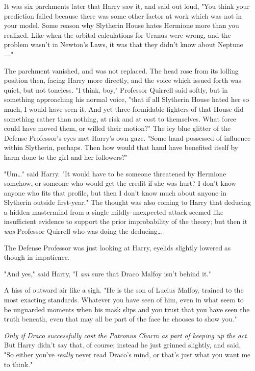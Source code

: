 It was six parchments later that Harry saw it, and said out loud, "You think
your prediction failed because there was some other factor at work which was
not in your model. Some reason why Slytherin House hates Hermione more than you
realized. Like when the orbital calculations for Uranus were wrong, and the
problem wasn't in Newton's Laws, it was that they didn't know about Neptune---"

The parchment vanished, and was not replaced. The head rose from its lolling
position then, facing Harry more directly, and the voice which issued forth was
quiet, but not toneless. "I think, boy," Professor Quirrell said softly, but in
something approaching his normal voice, "that if all Slytherin House hated her
so much, I would have seen it. And yet three formidable fighters of that House
did something rather than nothing, at risk and at cost to themselves. What
force could have moved them, or willed their motion?" The icy blue glitter of
the Defense Professor's eyes met Harry's own gaze. "Some hand possessed of
influence within Slytherin, perhaps. Then how would that hand have benefited
itself by harm done to the girl and her followers?"

"Um{\ldots}" said Harry. "It would have to be someone threatened by Hermione
somehow, or someone who would get the credit if she was hurt? I don't know
anyone who fits that profile, but then I don't know much about anyone in
Slytherin outside first-year." The thought was also coming to Harry that
deducing a hidden mastermind from a single mildly-unexpected attack seemed like
insufficient evidence to support the prior improbability of the theory; but
then it \emph{was} Professor Quirrell who was doing the deducing{\ldots}

The Defense Professor was just looking at Harry, eyelids slightly lowered as
though in impatience.

"And yes," said Harry, "I \emph{am} sure that Draco Malfoy isn't behind it."

A hiss of outward air like a sigh. "He is the son of Lucius Malfoy, trained to
the most exacting standards. Whatever you have seen of him, even in what seem
to be unguarded moments when his mask slips and you trust that you have seen
the truth beneath, even that may all be part of the face he chooses to show
you."

\emph{Only if Draco successfully cast the Patronus Charm as part of keeping up
the act.} But Harry didn't say that, of course; instead he just grinned
slightly, and said, "So either you've \emph{really} never read Draco's mind, or
that's just what you want me to think."

